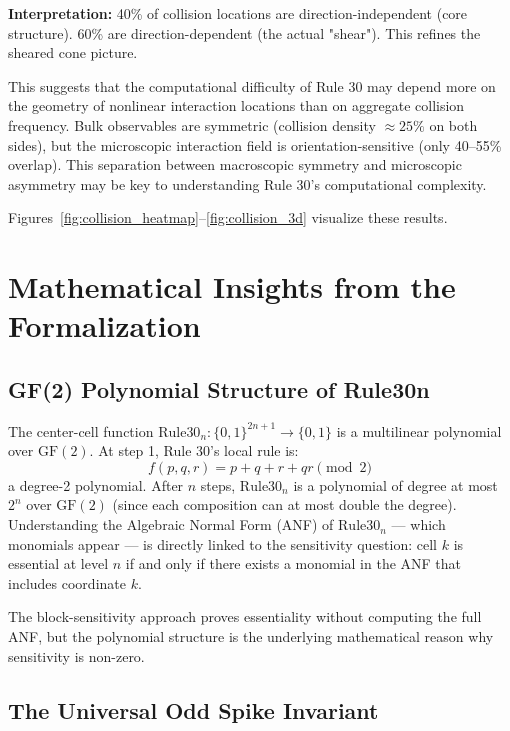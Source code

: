 \documentclass[11pt]{article}
\begin{document}
\textbf{Interpretation:} 40\% of collision locations are direction-independent
(core structure). 60\% are direction-dependent (the actual "shear"). This
refines the sheared cone picture.

This suggests that the computational difficulty of Rule 30 may depend more on 
the geometry of nonlinear interaction locations than on aggregate collision 
frequency. Bulk observables are symmetric (collision density $\approx 25\%$ on 
both sides), but the microscopic interaction field is orientation-sensitive 
(only 40--55\% overlap). This separation between macroscopic symmetry and 
microscopic asymmetry may be key to understanding Rule 30's computational 
complexity.

Figures~\ref{fig:collision_heatmap}--\ref{fig:collision_3d} visualize these results.

\section{Mathematical Insights from the Formalization}
\label{sec:math_insights}

\subsection{GF(2) Polynomial Structure of Rule30n}

The center-cell function $\mathrm{Rule30}_n : \{0,1\}^{2n+1} \to \{0,1\}$ is a multilinear polynomial over $\mathrm{GF}(2)$. At step 1, Rule 30's local rule is:
\[
  f(p,q,r) = p + q + r + qr \pmod{2}
\]
a degree-2 polynomial. After $n$ steps, $\mathrm{Rule30}_n$ is a polynomial of degree at most $2^n$ over $\mathrm{GF}(2)$ (since each composition can at most double the degree). Understanding the Algebraic Normal Form (ANF) of $\mathrm{Rule30}_n$ --- which monomials appear --- is directly linked to the sensitivity question: cell $k$ is essential at level $n$ if and only if there exists a monomial in the ANF that includes coordinate $k$.

The block-sensitivity approach proves essentiality without computing the full ANF, but the polynomial structure is the underlying mathematical reason why sensitivity is non-zero.

\subsection{The Universal Odd Spike Invariant}
\end{document}
